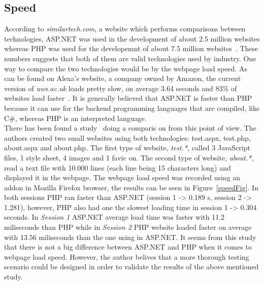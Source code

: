 \documentclass[11]{article}
\begin{document}
	\subsection{Speed}
   According to \textit{similartech.com}, a website which performs comparisons between technologies, ASP.NET was used in the development of about 2.5 million websites whereas PHP was used for the developemnt of about 7.5 million websites~\citep{CompPhpAsp}. These numbers suggests that both of them are valid technologies used by industry. One way to compare the two technologies would be by the webpage load speed. As can be found on Alexa's website, a company owned by Amazon, the current version of \textit{uws.ac.uk} loads pretty slow, on average 3.64 seconds and 83\% of websites load faster~\citep{LoadSpeed}.
It is generally believed that  ASP.NET is faster than PHP because it can use for the backend programming languages that are compiled, like C\#, whereas PHP is an interpreted language. \\
	\indent
	There has been found  a study~\citep{mirzoev2014webpage} doing a comparis on from this point of view. The authors created two small websites using both technologies:  test.aspx, test.php, about.aspx and about.php. The first type of website, \textit{test.*}, called 3 JavaScript files, 1 style sheet, 4 images and 1 favic on. The second type of website, \textit{about.*}, read a text file with 10.000 lines (each line being 15 characters long) and displayed it in the webpage. The webpage load speed was recorded using an addon in Mozilla Firefox browser, the results can be seen in Figure~\ref{speedFig}. In both sessions PHP ran faster than ASP.NET (session 1 -> 0.189 s, session 2 -> 1.281), however, PHP also had one the slowest loading time in session 1 -> 0.304 seconds. In \textit{Session 1} ASP.NET average load time was faster with 11.2 miliseconds than PHP while in \textit{Session 2} PHP website loaded faster on average with 13.56 miliseconds than the one using in ASP.NET. It seems from this study that there is not a big difference between ASP.NET and PHP when it comes to webpage load speed. However, the author belives that a more thorough testing scenario could be designed in order to validate the results of the above mentioned study. 
\end{document}
